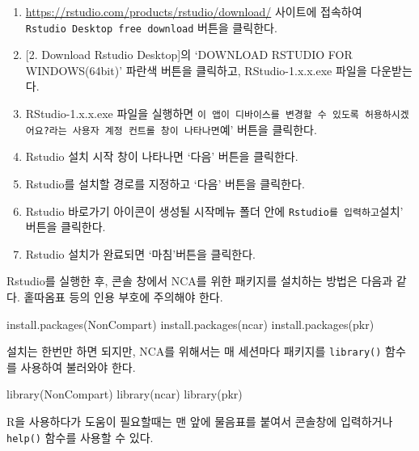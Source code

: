 \documentclass[
  11pt,
  krantz2, a4paper, twoside]{krantz}
\newenvironment{Shaded}{\begin{snugshade}}{\end{snugshade}}
\newcommand{\FunctionTok}[1]{\textcolor[rgb]{0.00,0.00,0.00}{#1}}
\newcommand{\NormalTok}[1]{#1}
\newcommand{\StringTok}[1]{\textcolor[rgb]{0.31,0.60,0.02}{#1}}
\providecommand{\tightlist}{%
  \setlength{\itemsep}{0pt}\setlength{\parskip}{0pt}}
\theoremstyle{definition}
\theoremstyle{definition}
\theoremstyle{definition}
\theoremstyle{definition}
\theoremstyle{remark}
\begin{document}
\begin{enumerate}
\def\labelenumi{\arabic{enumi}.}
\tightlist
\item
  \url{https://rstudio.com/products/rstudio/download/} 사이트에 접속하여 \texttt{Rstudio\ Desktop\ free\ download} 버튼을 클릭한다.
\item
  {[}2. Download Rstudio Desktop{]}의 `DOWNLOAD RSTUDIO FOR WINDOWS(64bit)' 파란색 버튼을 클릭하고, RStudio-1.x.x.exe 파일을 다운받는다.
\item
  RStudio-1.x.x.exe 파일을 실행하면 \texttt{이\ 앱이\ 디바이스를\ 변경할\ 수\ 있도록\ 허용하시겠어요?\textquotesingle{}라는\ 사용자\ 계정\ 컨트롤\ 창이\ 나타나면}예' 버튼을 클릭한다.
\item
  Rstudio 설치 시작 창이 나타나면 `다음' 버튼을 클릭한다.
\item
  Rstudio를 설치할 경로를 지정하고 `다음' 버튼을 클릭한다.
\item
  Rstudio 바로가기 아이콘이 생성될 시작메뉴 폴더 안에 \texttt{Rstudio\textquotesingle{}를\ 입력하고}설치' 버튼을 클릭한다.
\item
  Rstudio 설치가 완료되면 `마침'버튼을 클릭한다.
\end{enumerate}

Rstudio를 실행한 후, 콘솔 창에서 NCA를 위한 패키지를 설치하는 방법은 다음과 같다. 홑따옴표 등의 인용 부호에 주의해야 한다.

\begin{Shaded}
\begin{Highlighting}[]
\FunctionTok{install.packages}\NormalTok{(}\StringTok{\textquotesingle{}NonCompart\textquotesingle{}}\NormalTok{)}
\FunctionTok{install.packages}\NormalTok{(}\StringTok{\textquotesingle{}ncar\textquotesingle{}}\NormalTok{)}
\FunctionTok{install.packages}\NormalTok{(}\StringTok{\textquotesingle{}pkr\textquotesingle{}}\NormalTok{)}
\end{Highlighting}
\end{Shaded}

설치는 한번만 하면 되지만, NCA를 위해서는 매 세션마다 패키지를 \texttt{library()} 함수를 사용하여 불러와야 한다.

\begin{Shaded}
\begin{Highlighting}[]
\FunctionTok{library}\NormalTok{(NonCompart)}
\FunctionTok{library}\NormalTok{(ncar)}
\FunctionTok{library}\NormalTok{(pkr)}
\end{Highlighting}
\end{Shaded}

R을 사용하다가 도움이 필요할때는 맨 앞에 물음표를 붙여서 콘솔창에 입력하거나 \texttt{help()} 함수를 사용할 수 있다.
\end{document}
